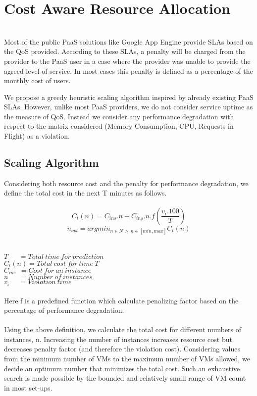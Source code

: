 \section{Cost Aware Resource Allocation}\\
Most of the public PaaS solutions like Google App Engine provide SLAs based on the QoS provided. According to these SLAs, a penalty will be charged from the provider to the PaaS user in a case where the provider was unable to provide the agreed level of service. In most cases this penalty is defined as a percentage of the monthly cost of users.

We propose a greedy heuristic scaling algorithm inspired by already existing PaaS SLAs. However, unlike most PaaS providers, we do not consider service uptime as the measure of QoS. Instead we consider any performance degradation with respect to the matrix considered (Memory Consumption, CPU, Requests in Flight) as a violation.

\subsection{Scaling Algorithm}
Considering both resource cost and the penalty for performance degradation, we define the total cost in the next T minutes as follows.\\
\\
\textbf{$$ C_t(n) = C_{ins}.n  + C_{ins} . n . f(\frac{v_i.100}{T}) $$}
\textbf{$$n_{opt} = argmin_{n \in N \ \land \ n \in [min, max]}C_t(n)$$} \\
\\
$T\ \ \ \ \ \ \ = Total\ time\ for\ prediction $ \\
$C_t(n)  = Total\ cost\ for\ time\ T $ \\
$C_{ins}\ \ = Cost\ for\ an\ instance$   \\
$n\ \ \ \ \ \ \       = Number\ of\ instances $  \\
$v_i\ \ \ \ \ \    = Violation\ time $ \\
\\
Here f is a predefined function which calculate penalizing factor based on the percentage of performance degradation.\\
\\
Using the above definition, we calculate the total cost for different numbers of instances, n. Increasing the number of instances increases resource cost but decreases penalty factor (and therefore the violation cost). Considering values from the minimum number of VMs to the maximum number of VMs allowed, we decide an optimum number that minimizes the total cost. Such an exhaustive search is made possible by the bounded and relatively small range of VM count in most set-ups.

